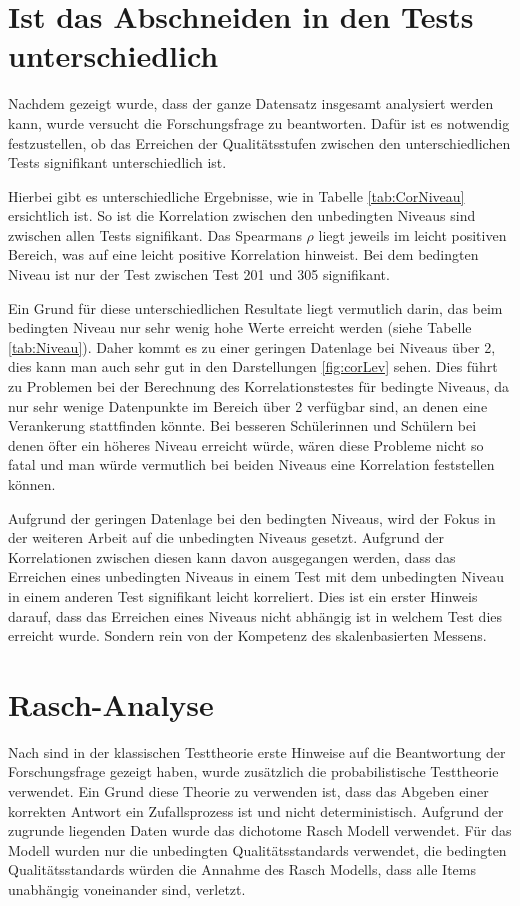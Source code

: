 \section{Ist das Abschneiden in den Tests unterschiedlich}

Nachdem gezeigt wurde, dass der ganze Datensatz insgesamt analysiert werden kann, wurde versucht die Forschungsfrage zu beantworten. Dafür ist es notwendig festzustellen, ob das Erreichen der Qualitätsstufen zwischen den unterschiedlichen Tests signifikant unterschiedlich ist.

Hierbei gibt es unterschiedliche Ergebnisse, wie in Tabelle \ref{tab:CorNiveau} ersichtlich ist. So ist die Korrelation zwischen den unbedingten Niveaus sind zwischen allen Tests signifikant. Das Spearmans $\rho$ liegt jeweils im leicht positiven Bereich, was auf eine leicht positive Korrelation hinweist. Bei dem bedingten Niveau ist nur der Test zwischen Test 201 und 305 signifikant.

Ein Grund für diese unterschiedlichen Resultate liegt vermutlich darin, das beim bedingten Niveau nur sehr wenig hohe Werte erreicht werden (siehe Tabelle \ref{tab:Niveau}). Daher kommt es zu einer geringen Datenlage bei Niveaus über 2, dies kann man auch sehr gut in den Darstellungen \ref{fig:corLev} sehen. Dies führt zu Problemen bei der Berechnung des Korrelationstestes für bedingte Niveaus, da nur sehr wenige Datenpunkte im Bereich über 2 verfügbar sind, an denen eine Verankerung stattfinden könnte. Bei besseren Schülerinnen und Schülern bei denen öfter ein höheres Niveau erreicht würde, wären diese Probleme nicht so fatal und man würde vermutlich bei beiden Niveaus eine Korrelation feststellen können.

Aufgrund der geringen Datenlage bei den bedingten Niveaus, wird der Fokus in der weiteren Arbeit auf die unbedingten Niveaus gesetzt. Aufgrund der Korrelationen zwischen diesen kann davon ausgegangen werden, dass das Erreichen eines unbedingten Niveaus in einem Test mit dem unbedingten Niveau in einem anderen Test signifikant leicht korreliert. Dies ist ein erster Hinweis darauf, dass das Erreichen eines Niveaus nicht abhängig ist in welchem Test dies erreicht wurde. Sondern rein von der Kompetenz des skalenbasierten Messens. 

\section{Rasch-Analyse}

Nach sind in der klassischen Testtheorie erste Hinweise auf die Beantwortung der Forschungsfrage gezeigt haben, wurde zusätzlich die probabilistische Testtheorie verwendet. Ein Grund diese Theorie zu verwenden ist, dass das Abgeben einer korrekten Antwort ein Zufallsprozess ist und nicht deterministisch. Aufgrund der zugrunde liegenden Daten wurde das dichotome Rasch Modell verwendet. Für das Modell wurden nur die unbedingten Qualitätsstandards verwendet, die bedingten Qualitätsstandards würden die Annahme des Rasch Modells, dass alle Items unabhängig voneinander sind, verletzt.

